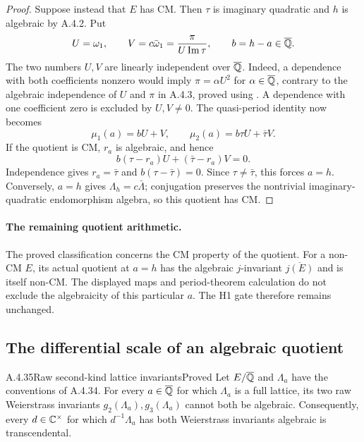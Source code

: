 \begin{proof}
Suppose instead that $E$ has CM. Then $\tau$ is imaginary quadratic
and $h$ is algebraic by A.4.2. Put
\[
 U=\omega_1,\qquad
 V=c\bar\omega_1=\frac{\pi}{U\operatorname{Im}\tau},\qquad
 b=h-a\in\overline{\mathbb Q}.
\]
The two numbers $U,V$ are linearly independent over $\overline{\mathbb Q}$.
Indeed, a dependence with both coefficients nonzero would imply
$\pi=\alpha U^2$ for $\alpha\in\overline{\mathbb Q}$, contrary to the algebraic
independence of $U$ and $\pi$ in A.4.3, proved using
\cite[Corollary 2, p.343]{EllChudnovsky1978}.
A dependence with one coefficient zero is excluded by $U,V\ne0$.
The quasi-period identity now becomes
\[
 \mu_1(a)=bU+V,\qquad
 \mu_2(a)=b\tau U+\bar\tau V.
\]
If the quotient is CM, $r_a$ is algebraic, and hence
\[
 b(\tau-r_a)U+(\bar\tau-r_a)V=0.
\]
Independence gives $r_a=\bar\tau$ and
$b(\tau-\bar\tau)=0$. Since $\tau\ne\bar\tau$, this forces
$a=h$. Conversely, $a=h$ gives $\Lambda_h=c\bar\Lambda$;
conjugation preserves the nontrivial imaginary-quadratic
endomorphism algebra, so this quotient has CM.
\end{proof}

\paragraph{The remaining quotient arithmetic.}
The proved classification concerns the CM property of the quotient.
For a non-CM $E$, its actual quotient at $a=h$ has the algebraic
$j$-invariant $\overline{j(E)}$ and is itself non-CM. The displayed
maps and period-theorem calculation do not exclude the algebraicity
of this particular $a$. The H1 gate therefore remains unchanged.

\subsection{The differential scale of an algebraic quotient}

\begin{result}{A.4.35}{Raw second-kind lattice invariants}{Proved}
Let $E/\overline{\mathbb Q}$ and $\Lambda_a$ have the conventions of A.4.34.
For every $a\in\overline{\mathbb Q}$ for which $\Lambda_a$ is a full lattice, its two
raw Weierstrass invariants $g_2(\Lambda_a),g_3(\Lambda_a)$ cannot
both be algebraic. Consequently, every $d\in\mathbb C^\times$ for which
$d^{-1}\Lambda_a$ has both Weierstrass invariants algebraic is
transcendental.
\end{result}

